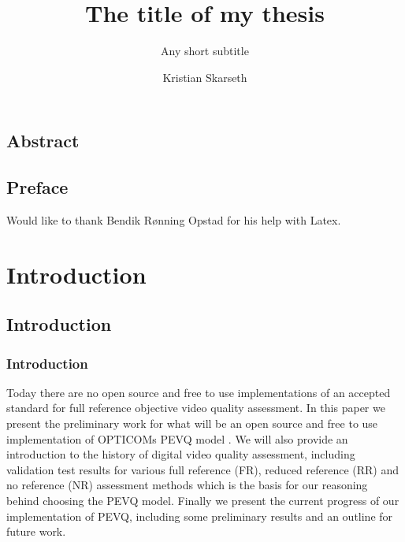 




\title{The title of my thesis}       
\subtitle{Any short subtitle}        
\author{Kristian Skarseth}  


\ififorside{}
\frontmatter{}
\maketitle{}

\chapter*{Abstract}                  

\tableofcontents{}
\listoffigures{}
\listoftables{}
\listofcodelistings

\chapter*{Preface}                  
Would like to thank Bendik Rønning Opstad for his help with Latex. 
\mainmatter{}

\part{Introduction}        
           
\chapter{Introduction}\label{chap:intro}

\section{Introduction}\label{sect:intro}
Today there are no open source and free to use implementations of an accepted standard for full reference objective video quality assessment. In this paper we present the preliminary work for what will be an open source and free to use implementation of OPTICOMs PEVQ model \cite{j.247}. We will also provide an introduction to the history of digital video quality assessment, including validation test results for various full reference (FR), reduced reference (RR) and no reference (NR) assessment methods which is the basis for our reasoning behind choosing the PEVQ model. Finally we present the current progress of our implementation of PEVQ, including some preliminary results and an outline for future work.


